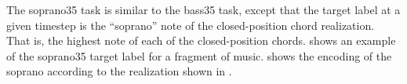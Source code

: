 
The \gls{soprano35} task is similar to the \gls{bass35}
task, except that the target label at a given timestep is
the ``soprano'' note of the \gls{closed-position} chord
realization. That is, the highest note of each of the
\gls{closed-position} chords.   shows an
example of the \gls{soprano35} target label for a fragment
of music.  shows the encoding of the
soprano according to the realization shown in
.

